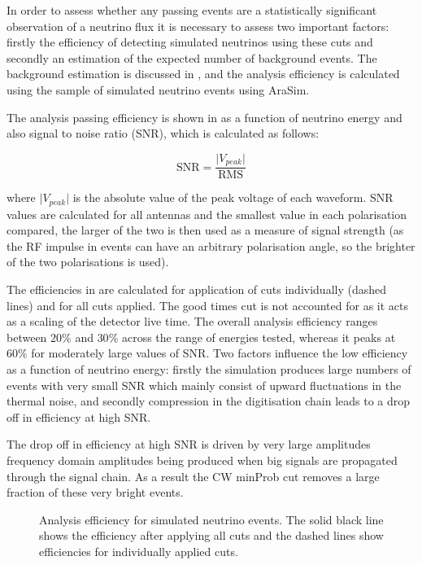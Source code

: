 In order to assess whether any passing events are a statistically significant observation of a neutrino flux it is necessary to assess two important factors: firstly the efficiency of detecting simulated neutrinos using these cuts and secondly an estimation of the expected number of background events. The background estimation is discussed in , and the analysis efficiency is calculated using the sample of simulated neutrino events using AraSim.

The analysis passing efficiency is shown in  as a function of neutrino energy and also signal to noise ratio (SNR), which is calculated as follows:

\begin{equation}
  \mbox{SNR} = \frac{\lvert V_{peak} \rvert}{\mbox{RMS}}
\end{equation}

\noindent where $\lvert V_{peak} \rvert$ is the absolute value of the peak voltage of each waveform. SNR values are calculated for all antennas and the smallest value in each polarisation compared, the larger of the two is then used as a measure of signal strength (as the RF impulse in events can have an arbitrary polarisation angle, so the brighter of the two polarisations is used).

The efficiencies in  are calculated for application of cuts individually (dashed lines) and for all cuts applied. The good times cut is not accounted for as it acts as a scaling of the detector live time. The overall analysis efficiency ranges between $20 \%$ and $30 \%$ across the range of energies tested, whereas it peaks at $60 \%$ for moderately large values of SNR. Two factors influence the low efficiency as a function of neutrino energy: firstly the simulation produces large numbers of events with very small SNR which mainly consist of upward fluctuations in the thermal noise, and secondly compression in the digitisation chain leads to a drop off in efficiency at high SNR. 

The drop off in efficiency at high SNR is driven by very large amplitudes frequency domain amplitudes being produced when big signals are propagated through the signal chain. As a result the CW minProb cut removes a large fraction of these very bright events. 


\begin{figure}[htpb]
\hfill
{}
\caption{Analysis efficiency for simulated neutrino events. The solid black line shows the efficiency after applying all cuts and the dashed lines show efficiencies for individually applied cuts.}
\label{fig:Analysis:Cut-Results:Efficiency}
\end{figure}


